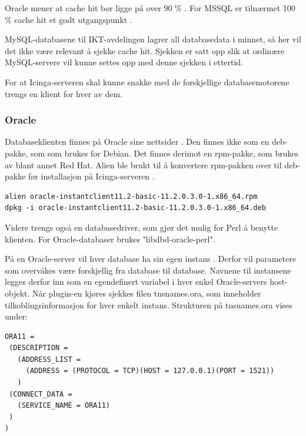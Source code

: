 Oracle mener at cache hit bør ligge på over 90 \% \cite{oraclecachehit}. For MSSQL er tilnærmet 100 \% cache hit et godt utgangspunkt \cite{sqlmonitoring}.

MySQL-databasene til IKT-avdelingen lagrer all databasedata i minnet, så her vil det ikke være relevant å sjekke cache hit. Sjekken er satt opp slik at ordinære MySQL-servere vil kunne settes opp med denne sjekken i ettertid.

For at Icinga-serveren skal kunne snakke med de forskjellige databasemotorene trengs en klient for hver av dem. 

\subsubsection{Oracle}
Databaseklienten finnes på Oracle sine nettsider \cite{oracleclient}. Den finnes ikke som en deb-pakke, som som brukes for Debian. Det finnes derimot en rpm-pakke, som brukes av blant annet Red Hat. Alien ble brukt til å konvertere rpm-pakken over til deb-pakke før installasjon på Icinga-serveren \cite{debian:alien}. 

\begin{lstlisting}[style=example]
alien oracle-instantclient11.2-basic-11.2.0.3.0-1.x86_64.rpm 
dpkg -i oracle-instantclient11.2-basic-11.2.0.3.0-1.x86_64.deb
\end{lstlisting}

Videre trengs også en databasedriver, som gjør det mulig for Perl å benytte klienten. For Oracle-databaser brukes "libdbd-oracle-perl".

På en Oracle-server vil hver database ha sin egen instans \cite{oraclefaq}. Derfor vil parametere som overvåkes være forskjellig fra database til database. Navnene til instansene legges derfor inn som en egendefinert variabel i hver enkel Oracle-servers host-objekt. Når plugin-en kjøres sjekkes filen tnsnames.ora, som inneholder tilkoblingsinformasjon for hver enkelt instans. Strukturen på tnsnames.ora vises under:

\begin{lstlisting}[style=example]
ORA11 =
 (DESCRIPTION = 
   (ADDRESS_LIST =
     (ADDRESS = (PROTOCOL = TCP)(HOST = 127.0.0.1)(PORT = 1521))
   )
 (CONNECT_DATA =
   (SERVICE_NAME = ORA11)
 )
)
\end{lstlisting}

